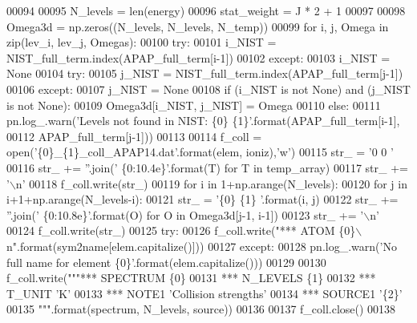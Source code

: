 \begin{DoxyCode}
00094     
00095     N\_levels = len(energy)
00096     stat\_weight = J * 2 + 1
00097         
00098     Omega3d = np.zeros((N\_levels, N\_levels, N\_temp))
00099     \textcolor{keywordflow}{for} i, j, Omega \textcolor{keywordflow}{in} zip(lev\_i, lev\_j, Omegas):
00100         \textcolor{keywordflow}{try}:
00101             i\_NIST = NIST\_full\_term.index(APAP\_full\_term[i-1])
00102         \textcolor{keywordflow}{except}:
00103             i\_NIST = \textcolor{keywordtype}{None}
00104         \textcolor{keywordflow}{try}:
00105             j\_NIST = NIST\_full\_term.index(APAP\_full\_term[j-1])
00106         \textcolor{keywordflow}{except}:
00107             j\_NIST = \textcolor{keywordtype}{None}
00108         \textcolor{keywordflow}{if} (i\_NIST \textcolor{keywordflow}{is} \textcolor{keywordflow}{not} \textcolor{keywordtype}{None}) \textcolor{keywordflow}{and} (j\_NIST \textcolor{keywordflow}{is} \textcolor{keywordflow}{not} \textcolor{keywordtype}{None}):
00109             Omega3d[i\_NIST, j\_NIST] = Omega
00110         \textcolor{keywordflow}{else}:
00111             pn.log\_.warn(\textcolor{stringliteral}{'Levels not found in NIST: \{0\} \{1\}'}.format(APAP\_full\_term[i-1], 
00112                                                                     APAP\_full\_term[j-1]))
00113             
00114     f\_coll = open(\textcolor{stringliteral}{'\{0\}\_\{1\}\_coll\_APAP14.dat'}.format(elem, ioniz),\textcolor{stringliteral}{'w'})
00115     str\_ = \textcolor{stringliteral}{'0   0 '}
00116     str\_ += \textcolor{stringliteral}{''}.join(\textcolor{stringliteral}{' \{0:10.4e\}'}.format(T) \textcolor{keywordflow}{for} T \textcolor{keywordflow}{in} temp\_array)
00117     str\_ += \textcolor{stringliteral}{'\(\backslash\)n'}
00118     f\_coll.write(str\_)
00119     \textcolor{keywordflow}{for} i \textcolor{keywordflow}{in} 1+np.arange(N\_levels):
00120         \textcolor{keywordflow}{for} j \textcolor{keywordflow}{in} i+1+np.arange(N\_levels-i):
00121             str\_ = \textcolor{stringliteral}{'\{0\} \{1\} '}.format(i, j)
00122             str\_ += \textcolor{stringliteral}{''}.join(\textcolor{stringliteral}{' \{0:10.8e\}'}.format(O) \textcolor{keywordflow}{for} O \textcolor{keywordflow}{in} Omega3d[j-1, i-1])
00123             str\_ += \textcolor{stringliteral}{'\(\backslash\)n'}
00124             f\_coll.write(str\_)
00125     \textcolor{keywordflow}{try}:
00126         f\_coll.write(\textcolor{stringliteral}{"*** ATOM \{0\}\(\backslash\)n"}.format(sym2name[elem.capitalize()]))
00127     \textcolor{keywordflow}{except}:
00128         pn.log\_.warn(\textcolor{stringliteral}{'No full name for element \{0\}'}.format(elem.capitalize()))
00129 
00130     f\_coll.write(\textcolor{stringliteral}{"""*** SPECTRUM \{0\}}
00131 \textcolor{stringliteral}{*** N\_LEVELS \{1\}}
00132 \textcolor{stringliteral}{*** T\_UNIT 'K'}
00133 \textcolor{stringliteral}{*** NOTE1 'Collision strengths'}
00134 \textcolor{stringliteral}{*** SOURCE1 '\{2\}'}
00135 \textcolor{stringliteral}{"""}.format(spectrum, N\_levels, source))
00136     
00137     f\_coll.close()
00138 

\end{DoxyCode}
